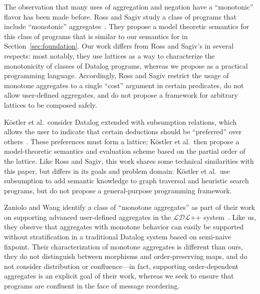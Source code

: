 The observation that many uses of aggregation and negation have a ``monotonic''
flavor has been made before. Ross and Sagiv study a class of programs that
include ``monotonic'' aggregates~\cite{Ross1992}. They propose a model theoretic
semantics for this class of programs that is similar to our semantics for
\baselang in Section~\ref{sec:foundation}. Our work differs from Ross and
Sagiv's in several respects: most notably, they use lattices as a way to
characterize the monotonicity of classes of Datalog programs, whereas we propose
\lang as a practical programming language. Accordingly, Ross and Sagiv restrict
the usage of monotone aggregates to a single ``cost'' argument in certain
predicates, do not allow user-defined aggregates, and do not propose a framework
for arbitrary lattices to be composed safely.

K\"{o}stler et al.\ consider Datalog extended with subsumption relations, which
allows the user to indicate that certain deductions should be ``preferred'' over
others~\cite{Kostler1995}. These preferences must form a lattice; K\"{o}stler et
al.\ then propose a model-theoretic semantics and evaluation scheme based on the
partial order of the lattice. Like Ross and Sagiv, this work shares some
technical similarities with this paper, but differs in its goals and problem
domain: K\"{o}stler et al.\ use subsumption to add semantic knowledge to graph
traversal and heuristic search programs, but do not propose a general-purpose
programming framework.

Zaniolo and Wang identify a class of ``monotone aggregates'' as part of their
work on supporting advanced user-defined aggregates in the $\mathcal{LDL}$++
system~\cite{Zaniolo1999}. Like us, they observe that aggregates with monotone
behavior can easily be supported without stratification in a traditional Datalog
system based on semi-naive fixpoint. Their characterization of monotone
aggregates is different than ours, they do not distinguish between morphisms and
order-preserving maps, and do not consider distribution or confluence---in fact,
supporting order-dependent aggregates is an explicit goal of their work, whereas
we seek to ensure that programs are confluent in the face of message reordering.
